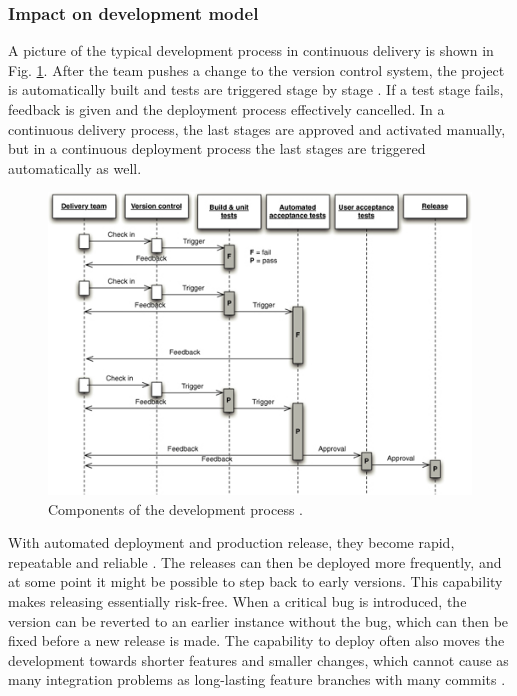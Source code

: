 \documentclass[english, grading]{tktltiki2}
\theoremstyle{definition}
\theoremstyle{remark}
\begin{document}
\subsubsection{Impact on development model}

A picture of the typical development process in continuous delivery is shown in Fig. \ref{fig4}. After the team pushes a change to the version control system, the project is automatically built and tests are triggered stage by stage \cite{cdbook}. If a test stage fails, feedback is given and the deployment process effectively cancelled. In a continuous delivery process, the last stages are approved and activated manually, but in a continuous deployment process the last stages are triggered automatically as well.

\begin{figure}[h]
	\centering
	\includegraphics[width=5.0in]{developmentprocess.jpg}
	\caption{Components of the development process \cite{cdbook}.}
	\label{fig4}
\end{figure}

With automated deployment and production release, they become rapid, repeatable and reliable \cite{cdbook}. The releases can then be deployed more frequently, and at some point it might be possible to step back to early versions. This capability makes releasing essentially risk-free. When a critical bug is introduced, the version can be reverted to an earlier instance without the bug, which can then be fixed before a new release is made. The capability to deploy often also moves the development towards shorter features and smaller changes, which cannot cause as many integration problems as long-lasting feature branches with many commits \cite{cdbook}.
\end{document}
